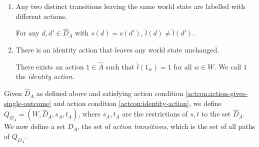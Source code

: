 \begin{enumerate}
    \item Any two distinct transitions leaving the same world state are labelled with different actions.
    \begin{action_condition}\label{actcon:action-gives-single-outcome}
        For any $d,d' \in \hat{D}_{A}$ with $s(d)=s(d')$, $\hat{l}(d) \neq \hat{l}(d')$.
    \end{action_condition}

    \item There is an identity action that leaves any world state unchanged.
    \begin{action_condition}\label{actcon:identity-action}
        There exists an action $1 \in \hat{A}$ such that $\hat{l}(1_{w})=1$ for all $w \in W$.
        We call $1$ the \textit{identity action}.
    \end{action_condition}
    
\end{enumerate}


Given $\hat{D}_{A}$ as defined above and satisfying  action condition \ref{actcon:action-gives-single-outcome} and  action condition \ref{actcon:identity-action}, we define $Q_{D_{A}} = (W, \hat{D}_{A}, s_{A}, t_{A})$, where $s_{A}, t_{A}$ are the restrictions of $s,t$ to the set $\hat{D}_{A}$.
We now define a set $D_{A}$, the set of \textit{action transitions}, which is the set of all paths of $Q_{D_{A}}$.


